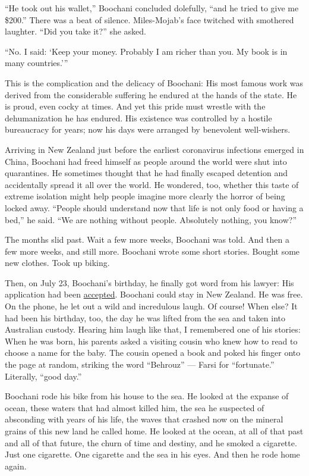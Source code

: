 ``He took out his wallet,'' Boochani concluded dolefully, ``and he tried
to give me \$200.'' There was a beat of silence. Miles-Mojab's face
twitched with smothered laughter. ``Did you take it?'' she asked.

``No. I said: `Keep your money. Probably I am richer than you. My book
is in many countries.'''

This is the complication and the delicacy of Boochani: His most famous
work was derived from the considerable suffering he endured at the hands
of the state. He is proud, even cocky at times. And yet this pride must
wrestle with the dehumanization he has endured. His existence was
controlled by a hostile bureaucracy for years; now his days were
arranged by benevolent well-wishers.

Arriving in New Zealand just before the earliest coronavirus infections
emerged in China, Boochani had freed himself as people around the world
were shut into quarantines. He sometimes thought that he had finally
escaped detention and accidentally spread it all over the world. He
wondered, too, whether this taste of extreme isolation might help people
imagine more clearly the horror of being locked away. ``People should
understand now that life is not only food or having a bed,'' he said.
``We are nothing without people. Absolutely nothing, you know?''

The months slid past. Wait a few more weeks, Boochani was told. And then
a few more weeks, and still more. Boochani wrote some short stories.
Bought some new clothes. Took up biking.

Then, on July 23, Boochani's birthday, he finally got word from his
lawyer: His application had been
\href{https://www.nytimes.com/2020/07/24/world/australia/behrouz-boochani-asylum-new-zealand.html}{accepted}.
Boochani could stay in New Zealand. He was free. On the phone, he let
out a wild and incredulous laugh. Of course! When else? It had been his
birthday, too, the day he was lifted from the sea and taken into
Australian custody. Hearing him laugh like that, I remembered one of his
stories: When he was born, his parents asked a visiting cousin who knew
how to read to choose a name for the baby. The cousin opened a book and
poked his finger onto the page at random, striking the word ``Behrouz''
--- Farsi for ``fortunate.'' Literally, ``good day.''

Boochani rode his bike from his house to the sea. He looked at the
expanse of ocean, these waters that had almost killed him, the sea he
suspected of absconding with years of his life, the waves that crashed
now on the mineral grains of this new land he called home. He looked at
the ocean, at all of that past and all of that future, the churn of time
and destiny, and he smoked a cigarette. Just one cigarette. One
cigarette and the sea in his eyes. And then he rode home again.

